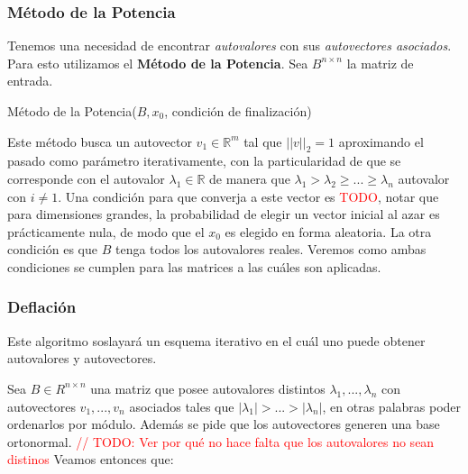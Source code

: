 \subsubsection{M\'etodo de la Potencia}\label{desarrollo_metodo-potencia}

Tenemos una necesidad de encontrar \textit{autovalores} con sus \textit{autovectores asociados}. Para esto utilizamos el \textbf{M\'etodo de la Potencia}. Sea $B^{n \times n}$ la matriz de entrada.

\begin{algorithm}
\begin{algorithmic}[1]
\ENDWHILE
{}
\end{algorithmic}
\caption{M\'etodo de la Potencia($B, x_{0}$, condici\'on de finalizaci\'on)}
\end{algorithm}

Este m\'etodo busca un autovector $v_{1} \in \mathbb{R}^{m}$ tal que $\vert\vert v \vert\vert_{2} = 1$ aproximando el pasado como par\'ametro iterativamente, con la particularidad de que se corresponde con el autovalor $\lambda_{1} \in \mathbb{R}$ de manera que $\lambda_{1} > \lambda_{2} \geq ... \geq \lambda_{n}$ autovalor con $i \neq 1$. Una condici\'on para que converja a este vector es \textcolor{red}{TODO}, notar que para dimensiones grandes, la probabilidad de elegir un vector inicial al azar es pr\'acticamente nula, de modo que el $x_{0}$ es elegido en forma aleatoria. La otra condici\'on es que $B$ tenga todos los autovalores reales. Veremos como ambas condiciones se cumplen para las matrices a las cu\'ales son aplicadas.

\subsubsection{Deflaci\'on}\label{desarrollo_deflacion}

Este algoritmo soslayar\'a un esquema iterativo en el cu\'al uno puede obtener autovalores y autovectores.

Sea $B \in R^{n \times n}$ una matriz que posee autovalores distintos $\lambda_{1}, ..., \lambda_{n}$ con autovectores $v_{1}, ..., v_{n}$ asociados tales que $\vert \lambda_{1} \vert > ... > \vert \lambda_{n} \vert$, en otras palabras poder ordenarlos por m\'odulo. Adem\'as se pide que los autovectores generen una base ortonormal. \textcolor{red}{// TODO: Ver por qu\'e no hace falta que los autovalores no sean distinos} Veamos entonces que: \\

